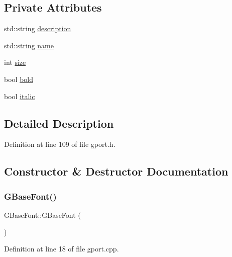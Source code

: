 \subsection*{Private Attributes}
\begin{DoxyCompactItemize}
\item 
std\+::string \mbox{\hyperlink{class_g_base_font_a81dc0a7c8b42df0a39e49cc304da7d06}{description}}
\item 
std\+::string \mbox{\hyperlink{class_g_base_font_a09217b162b03d74c2ea2e65bec537c5b}{name}}
\item 
int \mbox{\hyperlink{class_g_base_font_a3665d1d315cccd1d1487eed589a8da0f}{size}}
\item 
bool \mbox{\hyperlink{class_g_base_font_a710baf8db958e41f964cb8af600df4c7}{bold}}
\item 
bool \mbox{\hyperlink{class_g_base_font_aeff487abd13b9a9110b18a89ad51975e}{italic}}
\end{DoxyCompactItemize}


\subsection{Detailed Description}


Definition at line 109 of file gport.\+h.



\subsection{Constructor \& Destructor Documentation}
\mbox{\label{class_g_base_font_ae2afea9a892bb4d271f5fadb4566336b}} 
\subsubsection{\texorpdfstring{G\+Base\+Font()}{GBaseFont()}}
{\footnotesize\ttfamily G\+Base\+Font\+::\+G\+Base\+Font (\begin{DoxyParamCaption}{ }\end{DoxyParamCaption})}



Definition at line 18 of file gport.\+cpp.


